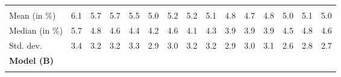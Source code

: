 \begin{tabular}{lllllllllllllll}
  \multicolumn{1}{|r}{} &
  \multicolumn{1}{r}{} &
  \multicolumn{1}{r}{} &
  \multicolumn{1}{r}{} &
  \multicolumn{1}{r}{} &
  \multicolumn{1}{r}{} &
  \multicolumn{1}{r}{} &
  \multicolumn{1}{r}{} &
  \multicolumn{1}{r}{} &
  \multicolumn{1}{r}{} &
  \multicolumn{1}{r}{} &
  \multicolumn{1}{r}{} &
  \multicolumn{1}{r}{} &
  \multicolumn{1}{r}{} \\
\multicolumn{1}{l}{\hspace{2em}Mean (in $\%$)} &
  \multicolumn{1}{|r}{6.1} &
  \multicolumn{1}{r}{5.7} &
  \multicolumn{1}{r}{5.7} &
  \multicolumn{1}{r}{5.5} &
  \multicolumn{1}{r}{5.0} &
  \multicolumn{1}{r}{5.2} &
  \multicolumn{1}{r}{5.2} &
  \multicolumn{1}{r}{5.1} &
  \multicolumn{1}{r}{4.8} &
  \multicolumn{1}{r}{4.7} &
  \multicolumn{1}{r}{4.8} &
  \multicolumn{1}{r}{5.0} &
  \multicolumn{1}{r}{5.1} &
  \multicolumn{1}{r}{5.0} \\
\multicolumn{1}{l}{\hspace{2em}Median (in $\%$)} &
  \multicolumn{1}{|r}{5.7} &
  \multicolumn{1}{r}{4.8} &
  \multicolumn{1}{r}{4.6} &
  \multicolumn{1}{r}{4.4} &
  \multicolumn{1}{r}{4.2} &
  \multicolumn{1}{r}{4.6} &
  \multicolumn{1}{r}{4.1} &
  \multicolumn{1}{r}{4.3} &
  \multicolumn{1}{r}{3.9} &
  \multicolumn{1}{r}{3.9} &
  \multicolumn{1}{r}{3.9} &
  \multicolumn{1}{r}{4.5} &
  \multicolumn{1}{r}{4.8} &
  \multicolumn{1}{r}{4.6} \\
\multicolumn{1}{l}{\hspace{2em}Std. dev.} &
  \multicolumn{1}{|r}{3.4} &
  \multicolumn{1}{r}{3.2} &
  \multicolumn{1}{r}{3.2} &
  \multicolumn{1}{r}{3.3} &
  \multicolumn{1}{r}{2.9} &
  \multicolumn{1}{r}{3.0} &
  \multicolumn{1}{r}{3.2} &
  \multicolumn{1}{r}{3.2} &
  \multicolumn{1}{r}{2.9} &
  \multicolumn{1}{r}{3.0} &
  \multicolumn{1}{r}{3.1} &
  \multicolumn{1}{r}{2.6} &
  \multicolumn{1}{r}{2.8} &
  \multicolumn{1}{r}{2.7} \\ \hline
\multicolumn{1}{l}{{\textbf{Model (B)}}} &
  \multicolumn{1}{|r}{} &
  \multicolumn{1}{r}{} &
  \multicolumn{1}{r}{} &
  \multicolumn{1}{r}{} &
  \multicolumn{1}{r}{} &
  \multicolumn{1}{r}{} &
  \multicolumn{1}{r}{} &
  \multicolumn{1}{r}{} &
  \multicolumn{1}{r}{} &
  \multicolumn{1}{r}{} &
  \multicolumn{1}{r}{} &
  \multicolumn{1}{r}{} &
  \multicolumn{1}{r}{} &
  \multicolumn{1}{r}{} \\ \hline
\multicolumn{1}{l}{\hspace{1em}{\textit{Mult. term} ($\widehat{\tau}^{adv}-1$)}} &
  \multicolumn{1}{|r}{} &
  \multicolumn{1}{r}{} &
  \multicolumn{1}{r}{} &

\end{tabular}
